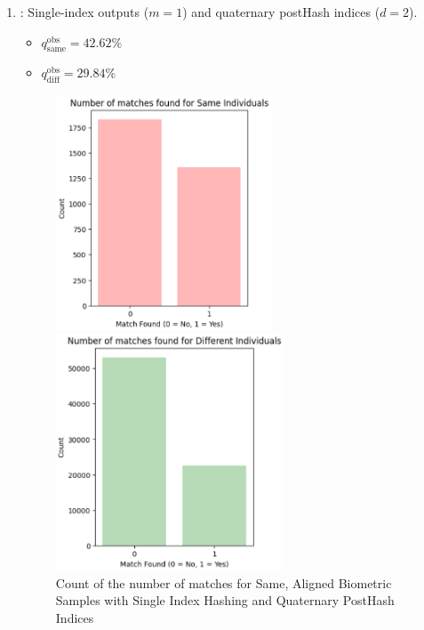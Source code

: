 \begin{enumerate}
    \item {}: Single-index outputs (\(m=1\)) and quaternary postHash indices (\(d=2\)).
    \begin{itemize}
        \item \(q_{\text{same}}^{\text{obs}} = 42.62\%\)
        \item \(q_{\text{diff}}^{\text{obs}} = 29.84\%\)
    \end{itemize}

    \begin{figure}[H]
        \centering
        \begin{minipage}[b]{0.48\linewidth}
            \centering
            \includegraphics[width=\linewidth,height=7cm,keepaspectratio]{latex-img/d2same.png}
            \caption{Count of the number of matches for Same, Aligned Biometric Samples with Single Index Hashing and Quaternary PostHash Indices}
            \label{mu_same}
        \end{minipage}
        \hfill
        \begin{minipage}[b]{0.48\linewidth}
            \centering
            \includegraphics[width=\linewidth,height=7cm,keepaspectratio]{latex-img/d2diff.png}

\end{minipage}
\end{figure}
\end{enumerate}
